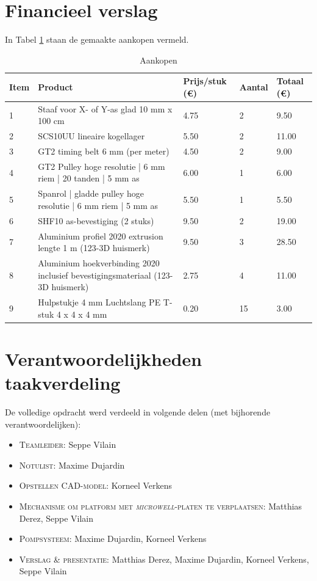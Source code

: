 \documentclass[a4paper,twoside,kulak]{kulakreport} %
\begin{document}
\section*{Financieel verslag}
\label{Appendix: Financieel verslag}

In Tabel \ref{tab:financieelVerslag} staan de gemaakte aankopen vermeld. 


\begin{table}[!hbt]
	\noindent\makebox[\textwidth]
	\sffamily
	
	\caption{Aankopen}
		\begin{tabular}{@{}lllll@{}}
		\toprule
		  Item & Product & Prijs/stuk (\euro) & Aantal & Totaal (\euro)   \\ \midrule
		1 & Staaf voor X- of Y-as glad 10 mm x 100 cm & 4.75 & 2 & 9.50 \\
		2 & SCS10UU lineaire kogellager  & 5.50 & 2 & 11.00 \\
		3 & GT2 timing belt 6 mm (per meter)  & 4.50 & 2 & 9.00 \\
		4 & GT2 Pulley hoge resolutie | 6 mm riem | 20 tanden | 5 mm as & 6.00 & 1 & 6.00 \\
		5 & Spanrol | gladde pulley hoge resolutie | 6 mm riem | 5 mm as & 5.50 & 1 & 5.50 \\
		6 & SHF10 as-bevestiging (2 stuks) & 9.50 & 2 & 19.00 \\
		7 & Aluminium profiel 2020 extrusion lengte 1 m (123-3D huismerk)  & 9.50 & 3 & 28.50 \\
		8 & Aluminium hoekverbinding 2020 inclusief bevestigingsmateriaal (123-3D huismerk) & 2.75 & 4 & 11.00 \\
		9 & Hulpstukje 4 mm Luchtslang PE T-stuk 4 x 4 x 4 mm & 0.20 & 15 & 3.00 \\
		\bottomrule
	\end{tabular}
	\label{tab:financieelVerslag}

	
\end{table}


\clearpage

\section*{Verantwoordelijkheden taakverdeling}

De volledige opdracht werd verdeeld in volgende delen (met bijhorende verantwoordelijken):
\begin{itemize}
	\item \textsc{Teamleider:} Seppe Vilain
	\item \textsc{Notulist}: Maxime Dujardin
	\item \textsc{Opstellen CAD-model}: Korneel Verkens
	\item \textsc{Mechanisme om platform met \textit{microwell}-platen te verplaatsen:} Matthias Derez, Seppe Vilain
	\item \textsc{Pompsysteem:} Maxime Dujardin, Korneel Verkens
	\item \textsc{Verslag \& presentatie:} Matthias Derez, Maxime Dujardin, Korneel Verkens, Seppe Vilain
	
\end{itemize}
\end{document}
